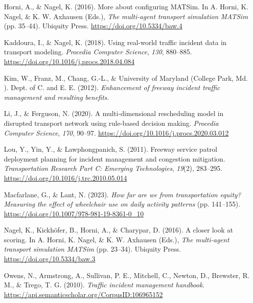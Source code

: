 \documentclass[fancy, oneside, mastersfancy, ms]{byuthesis}
\newlength{\cslhangindent}
\newlength{\cslentryspacingunit} %
\newenvironment{CSLReferences}[2] %
 {%
  \setlength{\parindent}{0pt}
  \ifodd #1
  \let\oldpar\par
  \def\par{\hangindent=\cslhangindent\oldpar}
  \fi
  \setlength{\parskip}{#2\cslentryspacingunit}
 }%
 {}
\begin{document}
\begin{CSLReferences}{1}{0}
\leavevmode{}%
Horni, A., \& Nagel, K. (2016). More about configuring MATSim. In A.
Horni, K. Nagel, \& K. W. Axhausen (Eds.), \emph{The multi-agent
transport simulation MATSim} (pp. 35--44). Ubiquity Press.
\url{https://doi.org/10.5334/baw.4}

\leavevmode{}%
Kaddoura, I., \& Nagel, K. (2018). Using real-world traffic incident
data in transport modeling. \emph{Procedia Computer Science},
\emph{130}, 880--885. \url{https://doi.org/10.1016/j.procs.2018.04.084}

\leavevmode{}%
Kim, W., Franz, M., Chang, G.-L., \& University of Maryland (College
Park, Md. ). Dept. of C. and E. E. (2012). \emph{Enhancement of freeway
incident traffic management and resulting benefits.}

\leavevmode{}%
Li, J., \& Ferguson, N. (2020). A multi-dimensional rescheduling model
in disrupted transport network using rule-based decision making.
\emph{Procedia Computer Science}, \emph{170}, 90--97.
\url{https://doi.org/10.1016/j.procs.2020.03.012}

\leavevmode{}%
Lou, Y., Yin, Y., \& Lawphongpanich, S. (2011). Freeway service patrol
deployment planning for incident management and congestion mitigation.
\emph{Transportation Research Part C: Emerging Technologies},
\emph{19}(2), 283--295. \url{https://doi.org/10.1016/j.trc.2010.05.014}

\leavevmode{}%
Macfarlane, G., \& Lant, N. (2023). \emph{How far are we from
transportation equity? Measuring the effect of wheelchair use on daily
activity patterns} (pp. 141--155).
\url{https://doi.org/10.1007/978-981-19-8361-0_10}

\leavevmode{}%
Nagel, K., Kickhöfer, B., Horni, A., \& Charypar, D. (2016). A closer
look at scoring. In A. Horni, K. Nagel, \& K. W. Axhausen (Eds.),
\emph{The multi-agent transport simulation MATSim} (pp. 23--34).
Ubiquity Press. \url{https://doi.org/10.5334/baw.3}

\leavevmode{}%
Owens, N., Armstrong, A., Sullivan, P. E., Mitchell, C., Newton, D.,
Brewster, R. M., \& Trego, T. G. (2010). \emph{Traffic incident
management handbook}.
\url{https://api.semanticscholar.org/CorpusID:106965152}


\end{CSLReferences}
\end{document}
